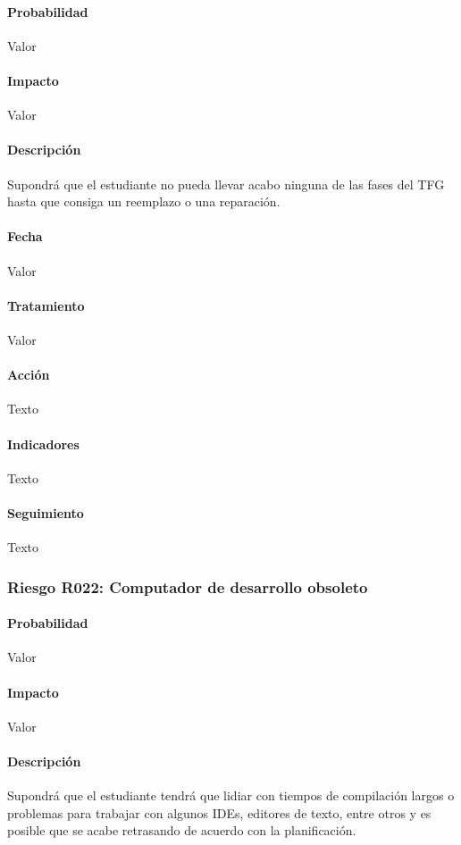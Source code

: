 \documentclass[10pt,a4paper]{article}
\begin{document}
				\paragraph{Probabilidad} Valor
				\paragraph{Impacto}	Valor
				\paragraph{Descripción} Supondrá que el estudiante no pueda llevar acabo ninguna de las fases del TFG hasta que consiga un reemplazo o una reparación.
				\paragraph{Fecha} Valor %
				\paragraph{Tratamiento} Valor %
				\paragraph{Acción} Texto %
				\paragraph{Indicadores} Texto %
				\paragraph{Seguimiento}	Texto %
				\subsubsection{Riesgo R022: Computador de desarrollo obsoleto}
				\paragraph{Probabilidad} Valor
				\paragraph{Impacto}	Valor
				\paragraph{Descripción} Supondrá que el estudiante tendrá que lidiar con tiempos de compilación largos o problemas para trabajar con algunos IDEs, editores de texto, entre otros y es posible que se acabe retrasando de acuerdo con la planificación.
\end{document}
